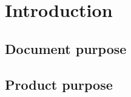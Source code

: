 \section{Introduction}
\subsection{Document purpose}
\subsection{Product purpose}\label{productPurpose}
\productPurpose
\begin{comment}
\subsection{References}
\subsubsection{Regulatory}
\begin{itemize}
\item \textbf{blablabla}: bablabla; %
\end{itemize}
\subsubsection{Informative}
\begin{itemize}
\item \textbf{blablabla}: bablabla; %
\end{itemize}
\end{comment}